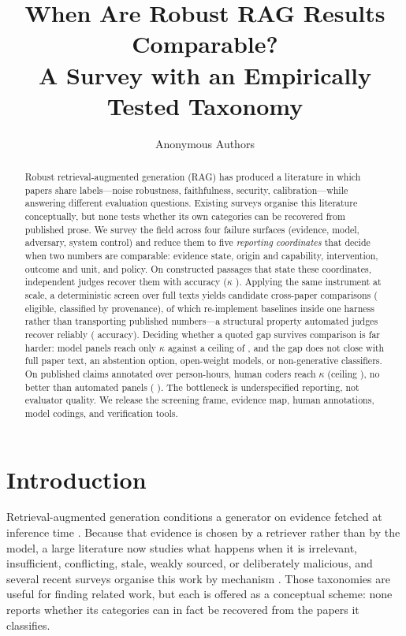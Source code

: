 \documentclass[11pt]{article}
\title{When Are Robust RAG Results Comparable?\\A Survey with an Empirically Tested Taxonomy}
\author{Anonymous Authors}
\date{}
\begin{document}
\maketitle

\begin{abstract}
Robust retrieval-augmented generation (RAG) has produced a literature in which papers share
labels---noise robustness, faithfulness, security, calibration---while answering different
evaluation questions. Existing surveys organise this literature conceptually, but none tests
whether its own categories can be recovered from published prose. We survey the field across
four failure surfaces (evidence, model, adversary, system control) and reduce them to five
\emph{reporting coordinates} that decide when two numbers are comparable: evidence state,
origin and capability, intervention, outcome and unit, and policy. On constructed passages
that state these coordinates, independent judges recover them with \InsFullCoord{} accuracy
($\kappa$ \InsFullK{}). Applying the same instrument at scale, a deterministic screen over
\FlowTexts{} full texts yields \FrameCandidates{} candidate cross-paper comparisons
(\CensusEligible{} eligible, \ProvClassified{} classified by provenance), of which
\ProvReimplemented{} re-implement baselines inside one harness rather than transporting
published numbers---a structural property automated judges recover reliably (\DepPvAcc{}
\DepPvCI{} accuracy). Deciding whether a quoted gap survives comparison is far harder: model
panels reach only $\kappa$ \DecVerdictK{} against a ceiling of \KmaxVerdict{}, and the gap
does not close with full paper text, an abstention option, \OwjNOpen{} open-weight models, or
non-generative classifiers. On \HumN{} published claims annotated over \HumHours{}
person-hours, human coders reach $\kappa$ \HumVerdictK{} \HumVerdictKCI{} (ceiling
\HumVerdictKmax{}), no better than automated panels (\HumGapDelta{} \HumGapCI{}). The
bottleneck is underspecified reporting, not evaluator quality. We release the screening frame,
evidence map, human annotations, model codings, and verification tools.
\end{abstract}

\section{Introduction}
\label{sec:introduction}

Retrieval-augmented generation conditions a generator on evidence fetched at inference time
\citep{lewis2020rag,dpr2020,realm2020}. Because that evidence is chosen by a retriever rather
than by the model, a large literature now studies what happens when it is irrelevant,
insufficient, conflicting, stale, weakly sourced, or deliberately malicious, and several
recent surveys organise this work by mechanism \citep{ragSurvey2024,ragEvaluationSurvey2024,
trustRAGCompass2024,securityRAGSurvey2026,xuKnowledgeConflicts2024,wenAbstentionSurvey2025}.
Those taxonomies are useful for finding related work, but each is offered as a conceptual
scheme: none reports whether its categories can in fact be recovered from the papers it
classifies.
\end{document}
